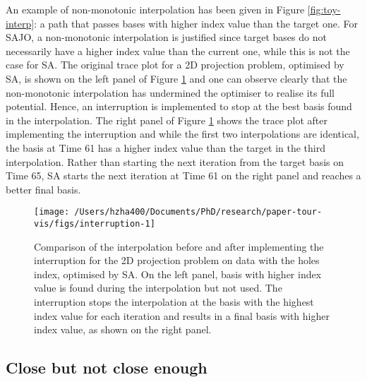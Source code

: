 An example of non-monotonic interpolation has been given in Figure
\ref{fig:toy-interp}: a path that passes bases with higher index value
than the target one. For SAJO, a non-monotonic interpolation is
justified since target bases do not necessarily have a higher index
value than the current one, while this is not the case for SA. The
original trace plot for a 2D projection problem, optimised by SA, is
shown on the left panel of Figure \ref{fig:interruption} and one can
observe clearly that the non-monotonic interpolation has undermined the
optimiser to realise its full potential. Hence, an interruption is
implemented to stop at the best basis found in the interpolation. The
right panel of Figure \ref{fig:interruption} shows the trace plot after
implementing the interruption and while the first two interpolations are
identical, the basis at Time 61 has a higher index value than the target
in the third interpolation. Rather than starting the next iteration from
the target basis on Time 65, SA starts the next iteration at Time 61 on
the right panel and reaches a better final basis.

\begin{Schunk}
\begin{figure}

{\centering \texttt{[image: /Users/hzha400/Documents/PhD/research/paper-tour-vis/figs/interruption-1]} 

}

\caption[Comparison of the interpolation before and after implementing the interruption for the 2D projection problem on  data with the holes index, optimised by SA]{Comparison of the interpolation before and after implementing the interruption for the 2D projection problem on  data with the holes index, optimised by SA. On the left panel, basis with higher index value is found during the interpolation but not used. The interruption stops the interpolation at the basis with the highest index value for each iteration and results in a final basis with higher index value, as shown on the right panel.}\label{fig:interruption}
\end{figure}
\end{Schunk}

\hypertarget{close-but-not-close-enough}{%
\subsection{Close but not close
enough}\label{close-but-not-close-enough}}

